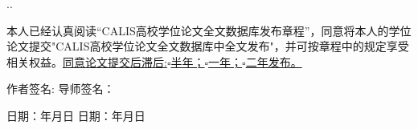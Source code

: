 \begin{center}
.\dotfill .
\parbox[t][2.2cm][c]{\textwidth}{
\hspace{2em}本人已经认真阅读“CALIS高校学位论文全文数据库发布章程”，同意将本人的学位论文提交"CALIS高校学位论文全文数据库中全文发布"，并可按章程中的规定享受相关权益。\underline{同意论文提交后滞后:$\square$半年；$\square$一年；$\square$二年发布。}}
\parbox[t][1.8cm][c]{\textwidth}{\fangsong
\hspace{2em}作者签名: \hspace*{5.4cm} 导师签名：}
\parbox[t][0.1cm][c]{\textwidth}{\fangsong
\hspace{2em}日期：\underline{\hspace{3em}}年\underline{\hspace{2em}}月\underline{\hspace{2em}}日
\hspace*{1.5cm}日期：\underline{\hspace{3em}}年\underline{\hspace{2em}}月\underline{\hspace{2em}}日}

\end{center}
